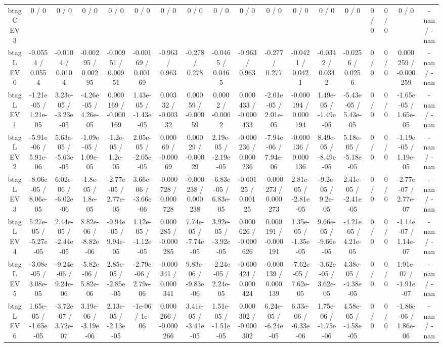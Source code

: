 \documentclass[10pt]{article}
\begin{document}
\begin{table}[htbp]
\begin{center}
\begin{tabular}{|c|c|c|c|c|c|c|c|c|c|c|c|c|c|c|c|c|c|}
  btag C EV 3 & 0 / 0 & 0 / 0 & 0 / 0 & 0 / 0 & 0 / 0 & 0 / 0 & 0 / 0 & 0 / 0 & 0 / 0 & 0 / 0 & 0 / 0 & 0 / 0 & 0 / 0 & 0 / 0 & 0 / 0 & 0 / 0 & -nan / -nan \\ 
  btag L EV 0 & -0.0554 / 0.0554 & -0.0104 / 0.0104 & -0.00295 / 0.00295 & -0.00951 / 0.00951 & -0.00169 / 0.00169 & -0.963 / 0.963 & -0.278 / 0.278 & -0.0465 / 0.0465 & -0.963 / 0.963 & -0.277 / 0.277 & -0.0421 / 0.0421 & -0.0342 / 0.0342 & -0.0256 / 0.0256 & 0 / 0 & 0 / 0 & 0.000259 / -0.000259 & -nan / -nan \\ 
  btag L EV 1 & -1.21e-05 / 1.21e-05 & 3.23e-05 / -3.23e-05 & -4.26e-05 / 4.26e-05 & 0.000169 / -0.000169 & 1.43e-05 / -1.43e-05 & 0.00332 / -0.00332 & 0.00059 / -0.00059 & 0.0002 / -0.0002 & 0.000433 / -0.000433 & -2.01e-05 / 2.01e-05 & -0.000194 / 0.000194 & 1.49e-05 / -1.49e-05 & -5.43e-05 / 5.43e-05 & 0 / 0 & 0 / 0 & -1.65e-05 / 1.65e-05 & -nan / -nan \\ 
  btag L EV 2 & -5.91e-06 / 5.91e-06 & 5.63e-05 / -5.63e-05 & -1.09e-05 / 1.09e-05 & -1.2e-05 / 1.2e-05 & 2.05e-05 / -2.05e-05 & 0.00069 / -0.00069 & 0.00029 / -0.00029 & 2.19e-05 / -2.19e-05 & -0.000236 / 0.000236 & -7.94e-06 / 7.94e-06 & -0.000136 / 0.000136 & 8.49e-05 / -8.49e-05 & 5.18e-05 / -5.18e-05 & 0 / 0 & 0 / 0 & -1.19e-05 / 1.19e-05 & -nan / -nan \\ 
  btag L EV 3 & -8.06e-05 / 8.06e-05 & 6.02e-06 / -6.02e-06 & -1.8e-05 / 1.8e-05 & -2.77e-05 / 2.77e-05 & 3.66e-06 / -3.66e-06 & -0.000728 / 0.000728 & -0.000238 / 0.000238 & -6.83e-05 / 6.83e-05 & -0.00125 / 0.00125 & -0.000273 / 0.000273 & 2.81e-05 / -2.81e-05 & -9.2e-05 / 9.2e-05 & 2.41e-05 / -2.41e-05 & 0 / 0 & 0 / 0 & -2.77e-07 / 2.77e-07 & -nan / -nan \\ 
  btag L EV 4 & 5.27e-05 / -5.27e-05 & 2.44e-05 / -2.44e-05 & 8.82e-06 / -8.82e-06 & -9.94e-05 / 9.94e-05 & 1.12e-05 / -1.12e-05 & 0.000285 / -0.000285 & 7.74e-05 / -7.74e-05 & 3.92e-05 / -3.92e-05 & 0.000626 / -0.000626 & 0.000191 / -0.000191 & 1.35e-05 / -1.35e-05 & 9.66e-05 / -9.66e-05 & -4.21e-05 / 4.21e-05 & 0 / 0 & 0 / 0 & -1.14e-07 / 1.14e-07 & -nan / -nan \\ 
  btag L EV 5 & -3.08e-05 / 3.08e-05 & -9.24e-06 / 9.24e-06 & -5.82e-06 / 5.82e-06 & 2.85e-05 / -2.85e-05 & -2.79e-06 / 2.79e-06 & -0.000341 / 0.000341 & 9.83e-06 / -9.83e-06 & -2.24e-05 / 2.24e-05 & -0.000424 / 0.000424 & -0.000139 / 0.000139 & -7.62e-05 / 7.62e-05 & -3.62e-05 / 3.62e-05 & 4.38e-05 / -4.38e-05 & 0 / 0 & 0 / 0 & 1.91e-07 / -1.91e-07 & -nan / -nan \\ 
  btag L EV 6 & 1.65e-05 / -1.65e-05 & -3.72e-07 / 3.72e-07 & 3.19e-06 / -3.19e-06 & 2.13e-05 / -2.13e-05 & -1e-06 / 1e-06 & 0.000266 / -0.000266 & 3.41e-05 / -3.41e-05 & 1.51e-05 / -1.51e-05 & 0.000302 / -0.000302 & 6.24e-05 / -6.24e-05 & 6.33e-06 / -6.33e-06 & 1.75e-06 / -1.75e-06 & 4.58e-05 / -4.58e-05 & 0 / 0 & 0 / 0 & -1.86e-06 / 1.86e-06 & -nan / -nan \\ 

\end{tabular}
\end{center}
\end{table}
\end{document}
